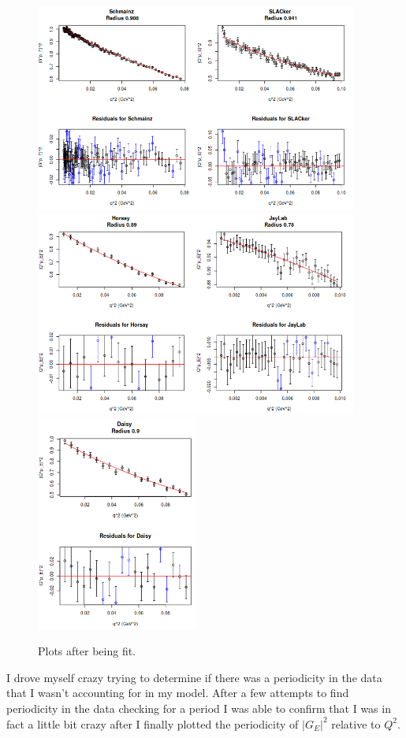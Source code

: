 \documentclass[12pt]{article}
\begin{document}
\begin{figure}[!htb]
  \centering
  \includegraphics[width=300pt]{fit_data_a.png}
  \includegraphics[width=300pt]{fit_data_b.png}
  \includegraphics[width=150pt]{fit_data_c.png}
  \caption{Plots after being fit.}
\end{figure}

I drove myself crazy trying to determine if there was a periodicity in the data that I wasn't accounting for in my model. After a few attempts to find periodicity in the data checking for a period I was able to confirm that I was in fact a little bit crazy after I finally plotted the periodicity of $\lvert G_E \rvert^2$ relative to $Q^2$.
\end{document}
